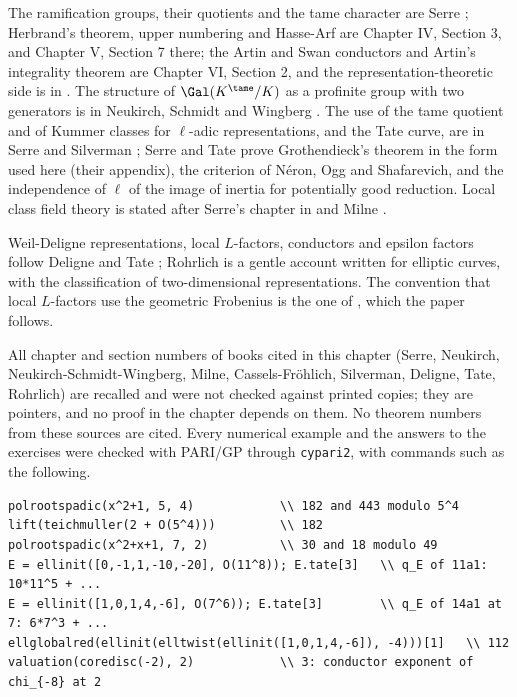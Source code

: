 The ramification groups, their quotients and the tame character are Serre \cite[Chapter IV, Sections 1 and 2]{SerreLocalFields}; Herbrand's theorem, upper
numbering and Hasse-Arf are Chapter IV, Section 3, and Chapter V, Section 7 there; the Artin and Swan conductors and Artin's integrality theorem are Chapter VI,
Section 2, and the representation-theoretic side is in \cite[Chapter 19]{SerreLinearReps}. The structure of $\Gal(K^{\tame}/K)$ as a profinite group with two
generators is in Neukirch, Schmidt and Wingberg \cite[Chapter VII, Section 5]{NSW}. The use of the tame quotient and of Kummer classes for $\ell$-adic
representations, and the Tate curve, are in Serre \cite[Chapters I and IV]{SerreAbelian} and Silverman \cite[Chapter V]{SilvermanATAEC}; Serre and Tate
\cite[Sections 1 and 2]{SerreTate68} prove Grothendieck's theorem in the form used here (their appendix), the criterion of N\'eron, Ogg and Shafarevich, and the
independence of $\ell$ of the image of inertia for potentially good reduction. Local class field theory is stated after Serre's chapter in
\cite{CasselsFrohlich} and Milne \cite[Chapter I]{MilneCFT}.

Weil-Deligne representations, local $L$-factors, conductors and epsilon factors follow Deligne \cite[Section 8]{Deligne73} and Tate \cite[Section 4]{Tate79};
Rohrlich \cite{Rohrlich94} is a gentle account written for elliptic curves, with the classification of two-dimensional representations. The convention that local
$L$-factors use the geometric Frobenius is the one of \cite[Section 1.7.2]{DFG04}, which the paper follows.

All chapter and section numbers of books cited in this chapter (Serre, Neukirch, Neukirch-Schmidt-Wingberg, Milne, Cassels-Fr\"ohlich, Silverman, Deligne, Tate,
Rohrlich) are recalled and were not checked against printed copies; they are pointers, and no proof in the chapter depends on them. No theorem numbers from
these sources are cited. Every numerical example and the answers to the exercises were checked with PARI/GP \cite{PARI} through \texttt{cypari2}, with
commands such as the following.
\begin{lstlisting}[language=GP]
polrootspadic(x^2+1, 5, 4)            \\ 182 and 443 modulo 5^4
lift(teichmuller(2 + O(5^4)))         \\ 182
polrootspadic(x^2+x+1, 7, 2)          \\ 30 and 18 modulo 49
E = ellinit([0,-1,1,-10,-20], O(11^8)); E.tate[3]   \\ q_E of 11a1: 10*11^5 + ...
E = ellinit([1,0,1,4,-6], O(7^6)); E.tate[3]        \\ q_E of 14a1 at 7: 6*7^3 + ...
ellglobalred(ellinit(elltwist(ellinit([1,0,1,4,-6]), -4)))[1]   \\ 112
valuation(coredisc(-2), 2)            \\ 3: conductor exponent of chi_{-8} at 2
\end{lstlisting}
